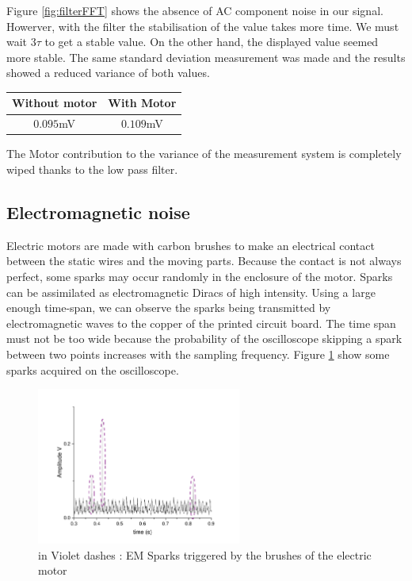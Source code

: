 \documentclass{article}[12pt]
\begin{document}
Figure \ref{fig:filterFFT} shows the absence of AC component noise in our signal. Howerver, with the filter the stabilisation of the value takes more time. We must wait $3\tau$ to get a stable value. On the other hand, the displayed value seemed more stable. The same standard deviation measurement was made and the results showed a reduced variance of both values.
\begin{center}
\begin{tabular}{|c|c|}
    \hline
    Without motor & With Motor \\
    \hline
     $0.095$mV & $0.109$mV \\
    \hline
\end{tabular}
\end{center}
The Motor contribution to the variance of the measurement system is completely wiped thanks to the low pass filter.
\subsection{Electromagnetic noise}
Electric motors are made with carbon brushes to make an electrical contact between the static wires and the moving parts. Because the contact is not always perfect, some sparks may occur randomly in the enclosure of the motor. Sparks can be assimilated as electromagnetic Diracs of high intensity. Using a large enough time-span, we can observe the sparks being transmitted by electromagnetic waves to the copper of the printed circuit board. The time span must not be too wide because the probability of the oscilloscope skipping a spark between two points increases with the sampling frequency. Figure \ref{fig:sparks} show some sparks acquired on the oscilloscope.
\begin{figure}[H]
    \centering
    \includegraphics[width=0.6\textwidth]{figures/sparks.pdf}
    \caption{in Violet dashes : EM Sparks triggered by the brushes of the electric motor}
    \label{fig:sparks}
\end{figure}
\end{document}
